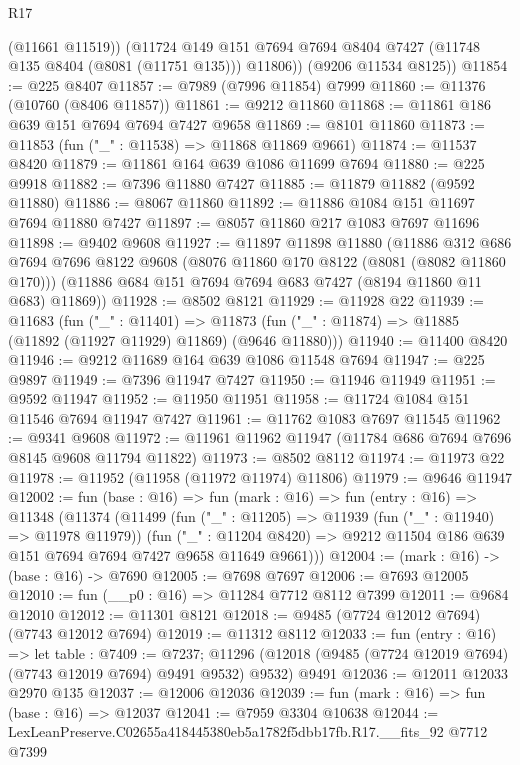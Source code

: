 \begin{lexlean}{R17}
\begin{coremodule}
          (@11661 @11519))
        (@11724 @149 @151 @7694 @7694 @8404 @7427 (@11748 @135 @8404 (@8081 (@11751 @135))) @11806))
      (@9206 @11534 @8125))
@11854 := @225 @8407
@11857 := @7989 (@7996 @11854) @7999
@11860 := @11376 (@10760 (@8406 @11857))
@11861 := @9212 @11860
@11868 := @11861 @186 @639 @151 @7694 @7694 @7427 @9658
@11869 := @8101 @11860
@11873 := @11853 (fun ("_" : @11538) => @11868 @11869 @9661)
@11874 := @11537 @8420
@11879 := @11861 @164 @639 @1086 @11699 @7694
@11880 := @225 @9918
@11882 := @7396 @11880 @7427
@11885 := @11879 @11882 (@9592 @11880)
@11886 := @8067 @11860
@11892 := @11886 @1084 @151 @11697 @7694 @11880 @7427
@11897 := @8057 @11860 @217 @1083 @7697 @11696
@11898 := @9402 @9608
@11927 := @11897
    @11898
    @11880
    (@11886
      @312
      @686
      @7694
      @7696
      @8122
      @9608
      (@8076 @11860 @170 @8122 (@8081 (@8082 @11860 @170)))
      (@11886 @684 @151 @7694 @7694 @683 @7427 (@8194 @11860 @11 @683) @11869))
@11928 := @8502 @8121
@11929 := @11928 @22
@11939 := @11683
    (fun ("_" : @11401) =>
    @11873 (fun ("_" : @11874) => @11885 (@11892 (@11927 @11929) @11869) (@9646 @11880)))
@11940 := @11400 @8420
@11946 := @9212 @11689 @164 @639 @1086 @11548 @7694
@11947 := @225 @9897
@11949 := @7396 @11947 @7427
@11950 := @11946 @11949
@11951 := @9592 @11947
@11952 := @11950 @11951
@11958 := @11724 @1084 @151 @11546 @7694 @11947 @7427
@11961 := @11762 @1083 @7697 @11545
@11962 := @9341 @9608
@11972 := @11961 @11962 @11947 (@11784 @686 @7694 @7696 @8145 @9608 @11794 @11822)
@11973 := @8502 @8112
@11974 := @11973 @22
@11978 := @11952 (@11958 (@11972 @11974) @11806)
@11979 := @9646 @11947
@12002 := fun (base : @16) =>
  fun (mark : @16) =>
  fun (entry : @16) =>
  @11348
    (@11374
      (@11499
        (fun ("_" : @11205) => @11939 (fun ("_" : @11940) => @11978 @11979))
        (fun ("_" : @11204 @8420) =>
        @9212 @11504 @186 @639 @151 @7694 @7694 @7427 @9658 @11649 @9661)))
@12004 := (mark : @16) -> (base : @16) -> @7690
@12005 := @7698 @7697
@12006 := @7693 @12005
@12010 := fun (__p0 : @16) => @11284 @7712 @8112 @7399
@12011 := @9684 @12010
@12012 := @11301 @8121
@12018 := @9485 (@7724 @12012 @7694) (@7743 @12012 @7694)
@12019 := @11312 @8112
@12033 := fun (entry : @16) =>
  let table : @7409 := @7237;
  @11296 (@12018 (@9485 (@7724 @12019 @7694) (@7743 @12019 @7694) @9491 @9532) @9532) @9491
@12036 := @12011 @12033 @2970 @135
@12037 := @12006 @12036
@12039 := fun (mark : @16) => fun (base : @16) => @12037
@12041 := @7959 @3304 @10638
@12044 := LexLeanPreserve.C02655a418445380eb5a1782f5dbb17fb.R17.__fits_92 @7712 @7399

\end{coremodule}
\end{lexlean}
